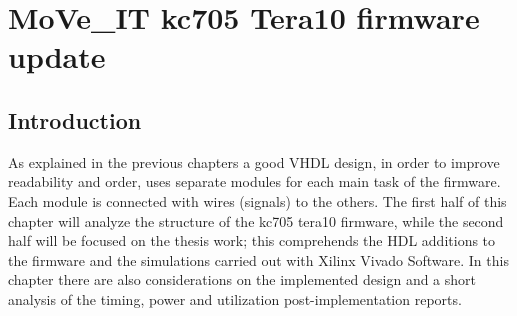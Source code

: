 \chapter{MoVe\_IT kc705 Tera10 firmware update}
\section{Introduction}
\noindent As explained in the previous chapters a good VHDL design, in order to improve readability and order, uses separate modules for each main task of the firmware. Each module is connected with wires (signals) to the others. The first half of this chapter will analyze the structure of the kc705 tera10 firmware, while the second half will be focused on the thesis work; this comprehends the HDL additions to the firmware and the simulations carried out with Xilinx Vivado Software.
In this chapter there are also considerations on the implemented design and a short analysis of the timing, power and utilization post-implementation reports. 

